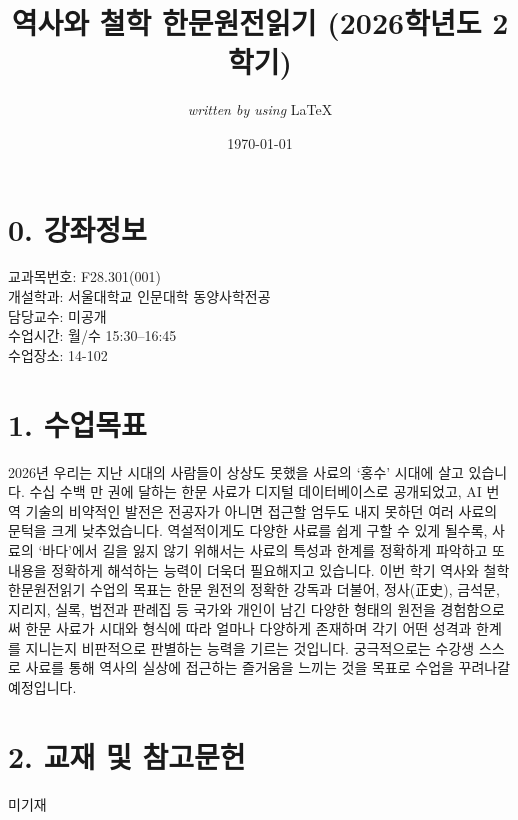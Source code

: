 \documentclass{article}
\begin{document}
\title{역사와 철학 한문원전읽기 (2026학년도 2학기)}
\author{\textit{written by using} \LaTeX}
\date{\today}
\maketitle
\thispagestyle{fancy}
\setcounter{secnumdepth}{0}
\bigskip

\section{0. 강좌정보}
\medskip
교과목번호: F28.301(001)\\
개설학과: 서울대학교 인문대학 동양사학전공\\
담당교수: 미공개\\
수업시간: 월/수 15:30--16:45\\
수업장소: 14-102

\section{1. 수업목표}
\medskip
2026년 우리는 지난 시대의 사람들이 상상도 못했을 사료의 `홍수' 시대에 살고 있습니다. 수십 수백 만 권에 달하는 한문 사료가 디지털 데이터베이스로 공개되었고, AI 번역 기술의 비약적인 발전은 전공자가 아니면 접근할 엄두도 내지 못하던 여러 사료의 문턱을 크게 낮추었습니다. 역설적이게도 다양한 사료를 쉽게 구할 수 있게 될수록, 사료의 `바다'에서 길을 잃지 않기 위해서는 사료의 특성과 한계를 정확하게 파악하고 또 내용을 정확하게 해석하는 능력이 더욱더 필요해지고 있습니다.
이번 학기 역사와 철학 한문원전읽기 수업의 목표는 한문 원전의 정확한 강독과 더불어, 정사(正史), 금석문, 지리지, 실록, 법전과 판례집 등 국가와 개인이 남긴 다양한 형태의 원전을 경험함으로써 한문 사료가 시대와 형식에 따라 얼마나 다양하게 존재하며 각기 어떤 성격과 한계를 지니는지 비판적으로 판별하는 능력을 기르는 것입니다. 궁극적으로는 수강생 스스로 사료를 통해 역사의 실상에 접근하는 즐거움을 느끼는 것을 목표로 수업을 꾸려나갈 예정입니다.

\section{2. 교재 및 참고문헌\protect\footnotemark}
\medskip
미기재

\newpage
\end{document}
